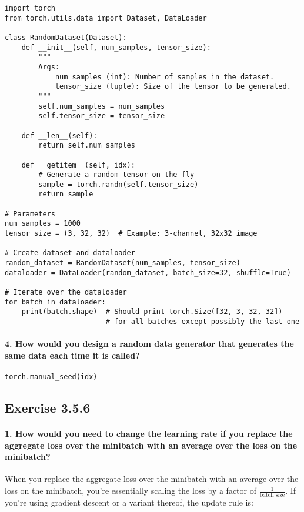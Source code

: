 \begin{verbatim}
import torch
from torch.utils.data import Dataset, DataLoader

class RandomDataset(Dataset):
    def __init__(self, num_samples, tensor_size):
        """
        Args:
            num_samples (int): Number of samples in the dataset.
            tensor_size (tuple): Size of the tensor to be generated.
        """
        self.num_samples = num_samples
        self.tensor_size = tensor_size

    def __len__(self):
        return self.num_samples

    def __getitem__(self, idx):
        # Generate a random tensor on the fly
        sample = torch.randn(self.tensor_size)
        return sample

# Parameters
num_samples = 1000
tensor_size = (3, 32, 32)  # Example: 3-channel, 32x32 image

# Create dataset and dataloader
random_dataset = RandomDataset(num_samples, tensor_size)
dataloader = DataLoader(random_dataset, batch_size=32, shuffle=True)

# Iterate over the dataloader
for batch in dataloader:
    print(batch.shape)  # Should print torch.Size([32, 3, 32, 32])
                        # for all batches except possibly the last one
\end{verbatim}

\paragraph{4. How would you design a random data generator that generates the same data each time it is called?}

\begin{verbatim}
torch.manual_seed(idx)
\end{verbatim}


\subsection{Exercise 3.5.6}

\paragraph{1. How would you need to change the learning rate if you replace the aggregate loss over the minibatch with an average over the loss on the minibatch?}

When you replace the aggregate loss over the minibatch with an average over the loss on the minibatch, you're essentially scaling the loss by a factor of \( \frac{1}{\text{batch size}} \).
If you're using gradient descent or a variant thereof, the update rule is:

